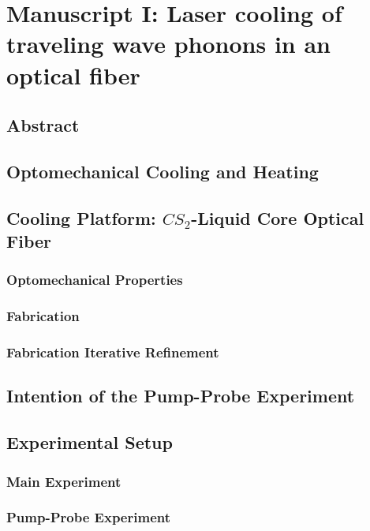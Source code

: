 \setcounter{rownumber}{0}
\singlespacing
\chapter{Manuscript I: Laser cooling of traveling wave phonons in an optical fiber}
\label{ch:Cooling}
\acresetall

\section{Abstract}

\section{Optomechanical Cooling and Heating}

\section{Cooling Platform: \texorpdfstring{$CS_{2}$}{CS2}-Liquid Core Optical Fiber}

  \subsection{Optomechanical Properties}

  \subsection{Fabrication}

  \subsection{Fabrication Iterative Refinement}

\section{Intention of the Pump-Probe Experiment}

\section{Experimental Setup}

  \subsection{Main Experiment}

  \subsection{Pump-Probe Experiment}

